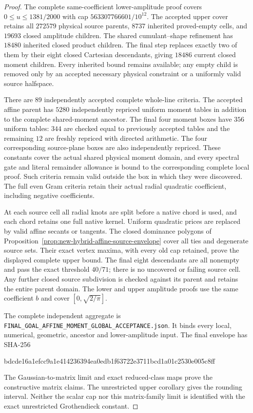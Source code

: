 \begin{proof}
The complete same-coefficient lower-amplitude proof covers
$0\leq u\leq1381/2000$ with cap
$563307766601/10^{12}$. The accepted upper cover retains all $272579$
physical source parents, $8737$ inherited proved-empty cells, and $19693$
closed amplitude children. The shared cumulant--shape refinement has
$18480$ inherited closed product children. The final step replaces exactly
two of them by their eight closed Cartesian descendants, giving
$18486$ current closed moment children. Every inherited bound remains
available; any empty child is
removed only by an accepted necessary physical constraint or a uniformly
valid source halfspace.

There are 89 independently accepted complete whole-line criteria.
The accepted affine parent has $5280$ independently repriced uniform
moment tables in addition to the complete shared-moment ancestor.
The final four moment boxes have $356$ uniform tables: $344$ are checked
equal to previously accepted tables and the remaining $12$ are freshly
repriced with directed arithmetic. The four corresponding source-plane
boxes are also independently repriced. These constants cover the actual shared physical
moment domain, and every spectral gate and literal remainder allowance
is bound to the corresponding complete local proof. Such criteria remain
valid outside the box in which they were discovered. The full even Gram
criteria retain their actual radial quadratic coefficient, including
negative coefficients.

At each source cell all radial knots are split before a native chord is
used, and each chord retains one full native kernel. Uniform quadratic
prices are replaced by valid affine secants or tangents. The closed
dominance polygons of Proposition~\ref{prop:new-hybrid-affine-source-envelope}
cover all ties and degenerate source sets. Their exact vertex maxima,
with every old cap retained, prove the displayed complete upper bound.
The final eight descendants are all nonempty and pass the exact threshold
$40/71$; there is no uncovered or failing source cell.
Any further closed source subdivision is checked against its parent and
retains the entire parent domain. The lower and upper amplitude proofs
use the same coefficient $b$ and cover $[0,\sqrt{2/\pi}]$.

The complete independent aggregate is
\texttt{FINAL\_GOAL\_AFFINE\_MOMENT\_GLOBAL\_ACCEPTANCE.json}. It binds every local, numerical, geometric,
ancestor and lower-amplitude input. The final envelope has SHA-256
\begin{center}\small\ttfamily
bdcde16a1efcc9a1e414236394ea0edb1f63722e3711bcd1a01c2530e005c8ff
\end{center}
The Gaussian-to-matrix limit and exact reduced-class maps prove the
constructive matrix claims. The unrestricted upper corollary gives the
rounding interval. Neither the scalar cap nor this matrix-family limit
is identified with the exact unrestricted Grothendieck constant.
\end{proof}
